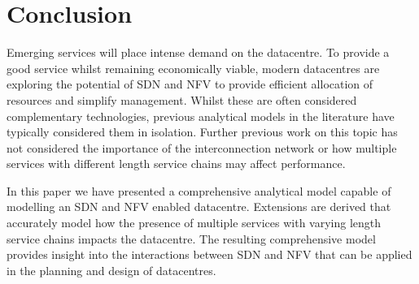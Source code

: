 
\section{Conclusion}
\label{sec:conclusions}
Emerging services will place intense demand on the datacentre. To provide a good service whilst remaining economically viable, modern datacentres are exploring the potential of SDN and NFV to provide efficient allocation of resources and simplify management. Whilst these are often considered complementary technologies, previous analytical models in the literature have typically considered them in isolation. Further previous work on this topic has not considered the importance of the interconnection network or how multiple services with different length service chains may affect performance.

In this paper we have presented a comprehensive analytical model capable of modelling an SDN and NFV enabled datacentre. Extensions are derived that accurately model how the presence of multiple services with varying length service chains impacts the datacentre. The resulting comprehensive model provides insight into the interactions between SDN and NFV that can be applied in the planning and design of  datacentres.